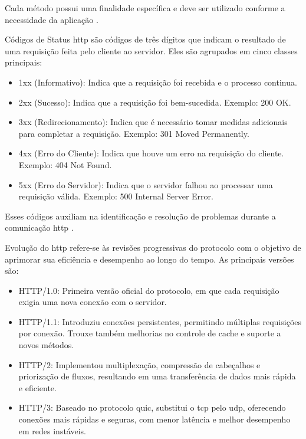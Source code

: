Cada método possui uma finalidade específica e deve ser utilizado conforme a necessidade da aplicação \cite{wikipedia_http}.


Códigos de Status \acrshort{http} são códigos de três dígitos que indicam o resultado de uma requisição feita pelo cliente ao servidor. Eles são agrupados em cinco classes principais:

\begin{itemize}
    \item 1xx (Informativo): Indica que a requisição foi recebida e o processo continua.
    \item 2xx (Sucesso): Indica que a requisição foi bem-sucedida. Exemplo: 200 OK.
    \item 3xx (Redirecionamento): Indica que é necessário tomar medidas adicionais para completar a requisição. Exemplo: 301 Moved Permanently.
    \item 4xx (Erro do Cliente): Indica que houve um erro na requisição do cliente. Exemplo: 404 Not Found.
    \item 5xx (Erro do Servidor): Indica que o servidor falhou ao processar uma requisição válida. Exemplo: 500 Internal Server Error.
\end{itemize}

Esses códigos auxiliam na identificação e resolução de problemas durante a comunicação \acrshort{http} \cite{mdn_http}.


Evolução do \acrshort{http} refere-se às revisões progressivas do protocolo com o objetivo de aprimorar sua eficiência e desempenho ao longo do tempo. As principais versões são:

\begin{itemize}
    \item HTTP/1.0: Primeira versão oficial do protocolo, em que cada requisição exigia uma nova conexão com o servidor.
    \item HTTP/1.1: Introduziu conexões persistentes, permitindo múltiplas requisições por conexão. Trouxe também melhorias no controle de cache e suporte a novos métodos.
    \item HTTP/2: Implementou multiplexação, compressão de cabeçalhos e priorização de fluxos, resultando em uma transferência de dados mais rápida e eficiente.
    \item HTTP/3: Baseado no protocolo \acrshort{quic}, substitui o \acrshort{tcp} pelo \acrshort{udp}, oferecendo conexões mais rápidas e seguras, com menor latência e melhor desempenho em redes instáveis.
\end{itemize}

